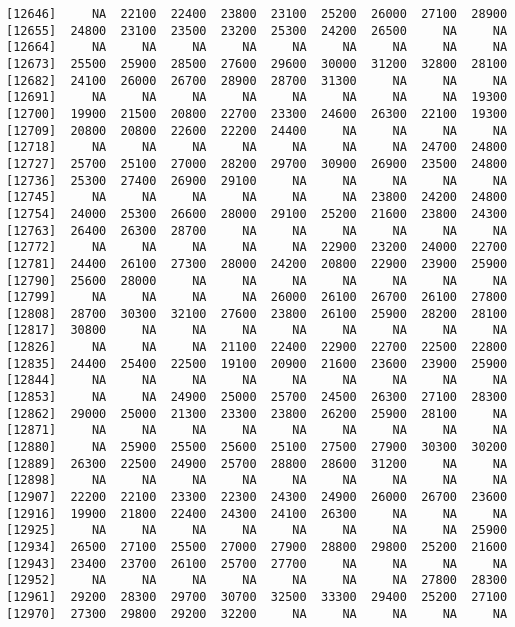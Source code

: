 \documentclass[]{article}
\begin{document}
\begin{verbatim}
[12646]     NA  22100  22400  23800  23100  25200  26000  27100  28900
[12655]  24800  23100  23500  23200  25300  24200  26500     NA     NA
[12664]     NA     NA     NA     NA     NA     NA     NA     NA     NA
[12673]  25500  25900  28500  27600  29600  30000  31200  32800  28100
[12682]  24100  26000  26700  28900  28700  31300     NA     NA     NA
[12691]     NA     NA     NA     NA     NA     NA     NA     NA  19300
[12700]  19900  21500  20800  22700  23300  24600  26300  22100  19300
[12709]  20800  20800  22600  22200  24400     NA     NA     NA     NA
[12718]     NA     NA     NA     NA     NA     NA     NA  24700  24800
[12727]  25700  25100  27000  28200  29700  30900  26900  23500  24800
[12736]  25300  27400  26900  29100     NA     NA     NA     NA     NA
[12745]     NA     NA     NA     NA     NA     NA  23800  24200  24800
[12754]  24000  25300  26600  28000  29100  25200  21600  23800  24300
[12763]  26400  26300  28700     NA     NA     NA     NA     NA     NA
[12772]     NA     NA     NA     NA     NA  22900  23200  24000  22700
[12781]  24400  26100  27300  28000  24200  20800  22900  23900  25900
[12790]  25600  28000     NA     NA     NA     NA     NA     NA     NA
[12799]     NA     NA     NA     NA  26000  26100  26700  26100  27800
[12808]  28700  30300  32100  27600  23800  26100  25900  28200  28100
[12817]  30800     NA     NA     NA     NA     NA     NA     NA     NA
[12826]     NA     NA     NA  21100  22400  22900  22700  22500  22800
[12835]  24400  25400  22500  19100  20900  21600  23600  23900  25900
[12844]     NA     NA     NA     NA     NA     NA     NA     NA     NA
[12853]     NA     NA  24900  25000  25700  24500  26300  27100  28300
[12862]  29000  25000  21300  23300  23800  26200  25900  28100     NA
[12871]     NA     NA     NA     NA     NA     NA     NA     NA     NA
[12880]     NA  25900  25500  25600  25100  27500  27900  30300  30200
[12889]  26300  22500  24900  25700  28800  28600  31200     NA     NA
[12898]     NA     NA     NA     NA     NA     NA     NA     NA     NA
[12907]  22200  22100  23300  22300  24300  24900  26000  26700  23600
[12916]  19900  21800  22400  24300  24100  26300     NA     NA     NA
[12925]     NA     NA     NA     NA     NA     NA     NA     NA  25900
[12934]  26500  27100  25500  27000  27900  28800  29800  25200  21600
[12943]  23400  23700  26100  25700  27700     NA     NA     NA     NA
[12952]     NA     NA     NA     NA     NA     NA     NA  27800  28300
[12961]  29200  28300  29700  30700  32500  33300  29400  25200  27100
[12970]  27300  29800  29200  32200     NA     NA     NA     NA     NA

\end{verbatim}
\end{document}
